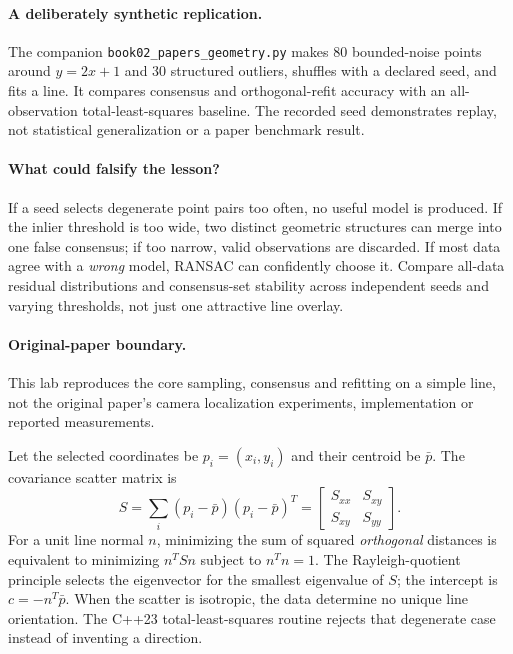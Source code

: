 \paragraph{A deliberately synthetic replication.}
The companion \texttt{book02\_papers\_}\allowbreak\texttt{geometry.py} makes 80
bounded-noise points around \(y=2x+1\) and 30 structured
outliers, shuffles with a declared seed, and fits a line.
It compares consensus and orthogonal-refit accuracy with
an all-observation total-least-squares baseline.
The recorded seed demonstrates replay, not statistical
generalization or a paper benchmark result.

\paragraph{What could falsify the lesson?}
If a seed selects degenerate point pairs too often, no useful
model is produced. If the inlier threshold is too wide,
two distinct geometric structures can merge into one
false consensus; if too narrow, valid observations are
discarded. If most data agree with a \emph{wrong} model,
RANSAC can confidently choose it. Compare all-data
residual distributions and consensus-set stability across
independent seeds and varying thresholds, not just one
attractive line overlay.

\paragraph{Original-paper boundary.}
This lab reproduces the core sampling, consensus and refitting
on a simple line, not the original paper's camera localization
experiments, implementation or reported measurements.


\begin{booktwoproof}
Let the selected coordinates be \(p_i=(x_i,y_i)\) and their
centroid be \(\bar p\). The covariance scatter matrix is
\[
 S=\sum_i(p_i-\bar p)(p_i-\bar p)^T
 =\begin{bmatrix}S_{xx}&S_{xy}\\S_{xy}&S_{yy}\end{bmatrix}.
\]
For a unit line normal \(n\), minimizing the sum of squared
\emph{orthogonal} distances is equivalent to minimizing
\(n^TSn\) subject to \(n^Tn=1\).
The Rayleigh-quotient principle selects the eigenvector
for the smallest eigenvalue of \(S\); the intercept is
\(c=-n^T\bar p\). When the scatter is isotropic,
the data determine no unique line orientation.
The C++23 total-least-squares routine rejects that
degenerate case instead of inventing a direction.
\end{booktwoproof}

